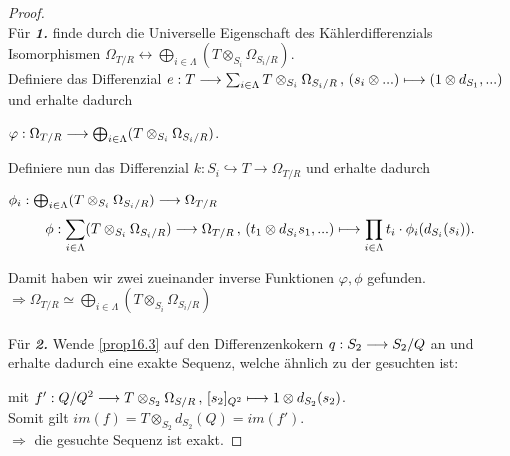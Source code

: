 \documentclass[10pt,a4paper]{report}
\newcommand{\functionfront}[3]{\nolinebreak{#1:#2 \longrightarrow #3}}
\newcommand{\function}[5]{\nolinebreak{#1:#2 \longrightarrow #3 \, , \, #4 \longmapsto #5}}
\newcommand{\divR}[2]{\Omega_{#1/#2}}
\newcommand{\Tensor}[3]{#1 \otimes_{#2} #3}
\newcommand{\tensor}[3]{#1 \otimes #3}
\newcommand{\immage}[1]{im(#1)}
\begin{document}
\begin{proof}\ \\
Für \textit{\textbf{1.}} finde durch die Universelle Eigenschaft des Kählerdifferenzials Isomorphismen $ \divR{T}{R} \longleftrightarrow \bigoplus_{i \in \Lambda} ( \Tensor{T}{S_i}{\divR{S_i}{R}} )$.\\
Definiere das Differenzial $\function{e}{T}{\sum_{i \in \Lambda} \Tensor{T}{S_i}{\divR{S_i}{R}}}{(\tensor{s_i}{R}{...})}{(\tensor{1}{S_i}{d_{S_1},...)}}$ und erhalte dadurch
\begin{center}
$\functionfront{\varphi}{\divR{T}{R}}{\bigoplus_{i\in \Lambda} ( \Tensor{T}{S_i}{\divR{S_i}{R}} )}$.
\end{center}
Definiere nun das Differenzial $k: S_i \hookrightarrow T \longrightarrow \divR{T}{R}$ und erhalte dadurch
\begin{center}
$\functionfront{\phi_i}{\bigoplus_{i\in \Lambda} ( \Tensor{T}{S_i}{\divR{S_i}{R}} )}{\divR{T}{R}}$\\
\begin{gather*}
\function{\phi}{\sum_{i\in \Lambda} ( \Tensor{T}{S_i}{\divR{S_i}{R}})}{\divR{T}{R}}{(\tensor{t_1}{S_1}{d_{S_i}s_1},...)}{\prod_{i\in \Lambda} t_i \cdot \phi_i(d_{S_i}(s_i))}. 
\end{gather*}
\end{center}
Damit haben wir zwei zueinander inverse Funktionen $\varphi ,\phi$ gefunden.\\
$\Rightarrow \divR{T}{R} \simeq \bigoplus_{i\in \Lambda} ( \Tensor{T}{S_i}{\divR{S_i}{R}} )$\\
\ \\
Für \textit{\textbf{2.}} Wende \cref{prop16.3} auf den Differenzenkokern $\functionfront{q}{S_2}{S_2/Q}$ an und erhalte dadurch eine exakte Sequenz, welche ähnlich zu der gesuchten ist:
\begin{center}
\end{center}
mit $\function{f'}{Q/Q^2}{{\Tensor{T}{S_2}{\divR{S}{R}}}}{[s_2]_{Q^2}}{\tensor{1}{S_2}{d_{S_2}(s_2)}}$.\\
Somit gilt $\immage{f} = \Tensor{T}{S_2}{d_{S_2}(Q)} = \immage{f'}$.\\
$\Rightarrow$ die gesuchte Sequenz ist exakt.
\end{proof}
\end{document}
